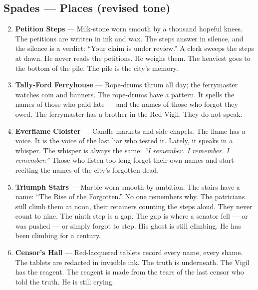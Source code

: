 \subsection*{Spades --- Places (revised tone)}
\begin{enumerate}
\setcounter{enumi}{1}
\item \textbf{Petition Steps} --- Milk-stone worn smooth by a thousand hopeful knees. The petitions are written in ink and wax. The steps answer in silence, and the silence is a verdict: ``Your claim is under review.'' A clerk sweeps the steps at dawn. He never reads the petitions. He weighs them. The heaviest goes to the bottom of the pile. The pile is the city's memory.
\item \textbf{Tally-Ford Ferryhouse} --- Rope-drums thrum all day; the ferrymaster watches coin and banners. The rope-drums have a pattern. It spells the names of those who paid late --- and the names of those who forgot they owed. The ferrymaster has a brother in the Red Vigil. They do not speak.
\item \textbf{Everflame Cloister} --- Candle markets and side-chapels. The flame has a voice. It is the voice of the last liar who tested it. Lately, it speaks in a whisper. The whisper is always the same: \textit{``I remember. I remember. I remember.''} Those who listen too long forget their own names and start reciting the names of the city's forgotten dead.
\item \textbf{Triumph Stairs} --- Marble worn smooth by ambition. The stairs have a name: ``The Rise of the Forgotten.'' No one remembers why. The patricians still climb them at noon, their retainers counting the steps aloud. They never count to nine. The ninth step is a gap. The gap is where a senator fell --- or was pushed --- or simply forgot to step. His ghost is still climbing. He has been climbing for a century.
\item \textbf{Censor's Hall} --- Red-lacquered tablets record every name, every shame. The tablets are redacted in invisible ink. The truth is underneath. The Vigil has the reagent. The reagent is made from the tears of the last censor who told the truth. He is still crying.
\end{enumerate}

